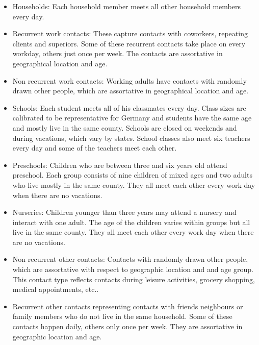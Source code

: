 \begin{itemize}
    \item Households: Each household member meets all other household members every day.


    \item Recurrent work contacts: These capture contacts with coworkers, repeating
          clients and superiors. Some of these recurrent contacts take place on every
          workday, others just once per week. The contacts are assortative in
          geographical location and age.

    \item Non recurrent work contacts: Working adults have contacts with randomly drawn
          other people, which are assortative in geographical location and age.

    \item Schools: Each student meets all of his classmates every day. Class sizes are
    calibrated to be representative for Germany and students have the same age and mostly
    live in the same county. Schools are closed on weekends and during vacations, which
    vary by states. School classes also meet six teachers every day and some of the
    teachers meet each other.

    \item Preschools: Children who are between three and six years old attend preschool.
    Each group consists of nine children of mixed ages and two adults who live mostly in
    the same county. They all meet each other every work day when there are no vacations.

    \item Nurseries: Children younger than three years may attend a nursery and interact
    with one adult. The age of the children varies within groups but all live in the same
    county. They all meet each other every work day when there are no vacations.

    \item Non recurrent other contacts: Contacts with randomly drawn other
    people, which are assortative with respect to geographic location and and age group.
    This contact type reflects contacts during leisure activities, grocery shopping,
    medical appointments, etc..

    \item Recurrent other contacts representing contacts with friends neighbours or
    family members who do not live in the same household. Some of these contacts happen
    daily, others only once per week. They are assortative in geographic location and
    age.


\end{itemize}

